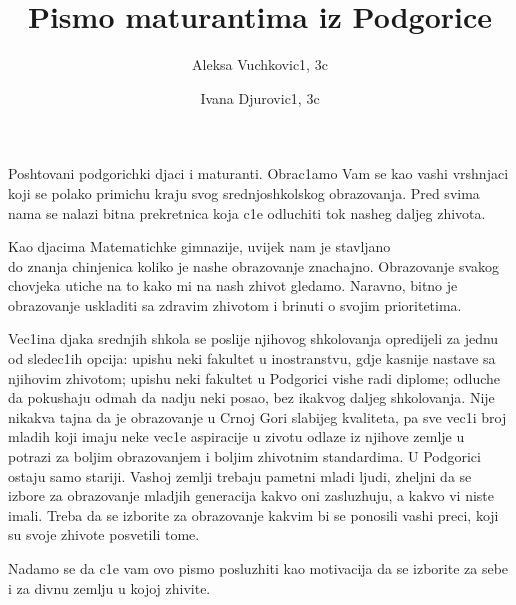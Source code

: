 \documentclass[11pt]{article}
\title{\bf{Pismo maturantima iz Podgorice}}
\author{
\Large Aleksa Vuchkovic1, 3c
\and
\Large Ivana Djurovic1, 3c
}
\date{}
\begin{document}
\maketitle
\Large
Poshtovani podgorichki djaci i maturanti. Obrac1amo Vam se kao vashi vrshnjaci koji se polako primichu kraju svog srednjoshkolskog obrazovanja. Pred svima nama se nalazi bitna prekretnica koja c1e odluchiti tok nasheg daljeg zhivota.

Kao djacima Matematichke gimnazije, uvijek nam je stavljano\\ do znanja chinjenica koliko je nashe obrazovanje znachajno. Obrazovanje svakog chovjeka utiche na to kako mi na nash zhivot gledamo. Naravno, bitno je obrazovanje uskladiti sa zdravim zhivotom i brinuti o svojim prioritetima.

Vec1ina djaka srednjih shkola se poslije njihovog shkolovanja opredijeli za jednu od sledec1ih opcija: upishu neki fakultet u inostranstvu, gd{}je kasnije nastave sa njihovim zhivotom; upishu neki fakultet u Podgorici vishe radi diplome; odluche da pokushaju odmah da nadju neki posao, bez ikakvog daljeg shkolovanja. Nije nikakva tajna da je obrazovanje u Crnoj Gori slabijeg kvaliteta, pa sve vec1i broj mladih koji imaju neke vec1e aspiracije u zivotu odlaze iz njihove zemlje u potrazi za boljim obrazovanjem i boljim zhivotnim standardima. U Podgorici ostaju samo stariji. Vashoj zemlji trebaju pametni mladi ljudi, zheljni da se izbore za obrazovanje mladjih generacija kakvo oni zasluzhuju, a kakvo vi niste imali. Treba da se izborite za obrazovanje kakvim bi se ponosili vashi preci, koji su svoje zhivote posvetili tome.

Nadamo se da c1e vam ovo pismo posluzhiti kao motivacija da se izborite za sebe i za divnu zemlju u kojoj zhivite.
\end{document}
